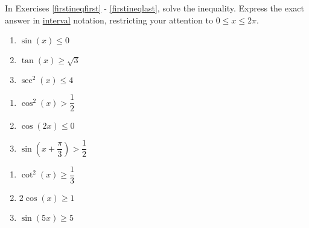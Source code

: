 In Exercises \ref{firstineqfirst} - \ref{firstineqlast}, solve the inequality.  Express the exact answer in \underline{interval} notation, restricting your attention to $0 \leq x \leq 2\pi$.

\begin{multicols}{3}

\begin{enumerate}

\setcounter{enumi}{\value{HW}}

\item $\sin \left( x \right) \leq 0$ \label{firstineqfirst}
\item $\tan \left( x \right) \geq \sqrt{3}$
\item $\sec^{2} \left( x \right) \leq 4$

\setcounter{HW}{\value{enumi}}

\end{enumerate}

\end{multicols}

\begin{multicols}{3}

\begin{enumerate}

\setcounter{enumi}{\value{HW}}

\item $\cos^{2} \left( x \right) > \dfrac{1}{2}$
\item $\cos \left( 2x \right) \leq 0$ 
\item $\sin \left( x + \dfrac{\pi}{3} \right) > \dfrac{1}{2}$

\setcounter{HW}{\value{enumi}}

\end{enumerate}

\end{multicols}

\begin{multicols}{3}

\begin{enumerate}

\setcounter{enumi}{\value{HW}}

\item $\cot^{2} \left( x \right) \geq \dfrac{1}{3}$
\item $2\cos(x) \geq 1$ 
\item $\sin(5x) \geq 5$ 

\setcounter{HW}{\value{enumi}}

\end{enumerate}

\end{multicols}

